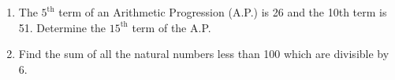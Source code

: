 
\begin{enumerate}
    \item The $5^{\text{th}}$ term of an Arithmetic Progression (A.P.) is 26 and the 10th term is 51. Determine the $15^{\text{th}}$ term of the A.P.
    \item Find the sum of all the natural numbers less than 100 which are divisible by 6.
\end{enumerate}


